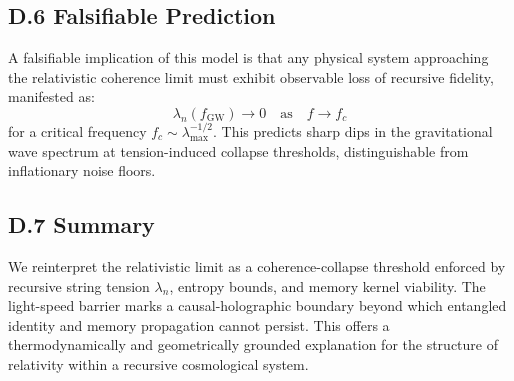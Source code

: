 \subsection*{D.6 Falsifiable Prediction}

A falsifiable implication of this model is that any physical system approaching the relativistic coherence limit must exhibit observable loss of recursive fidelity, manifested as:
\[
\lambda_n(f_{\text{GW}}) \to 0 \quad \text{as} \quad f \to f_c
\]
for a critical frequency \( f_c \sim \lambda_{\text{max}}^{-1/2} \). This predicts sharp dips in the gravitational wave spectrum at tension-induced collapse thresholds, distinguishable from inflationary noise floors.

\subsection*{D.7 Summary}

We reinterpret the relativistic limit as a coherence-collapse threshold enforced by recursive string tension \( \lambda_n \), entropy bounds, and memory kernel viability. The light-speed barrier marks a causal-holographic boundary beyond which entangled identity and memory propagation cannot persist. This offers a thermodynamically and geometrically grounded explanation for the structure of relativity within a recursive cosmological system.

